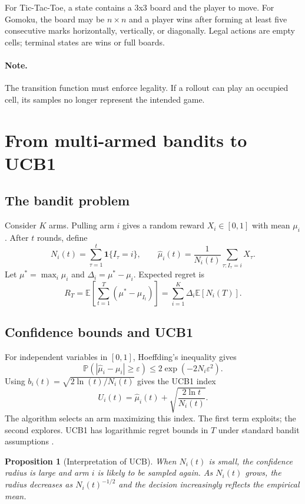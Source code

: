 \documentclass[conference]{IEEEtran}
\newtheorem{proposition}[definition]{Proposition}
\newcommand{\E}{\mathbb{E}}
\newcommand{\Prob}{\mathbb{P}}
\begin{document}
For Tic-Tac-Toe, a state contains a 3x3 board and the player to move. For Gomoku,
the board may be $n\times n$ and a player wins after forming at least five
consecutive marks horizontally, vertically, or diagonally. Legal actions are empty
cells; terminal states are wins or full boards.

\paragraph{Note.} The transition function must enforce legality. If a rollout can
play an occupied cell, its samples no longer represent the intended game.

\section{From multi-armed bandits to UCB1}
\subsection{The bandit problem}
Consider $K$ arms. Pulling arm $i$ gives a random reward $X_i\in[0,1]$ with mean
$\mu_i$. After $t$ rounds, define
\[
N_i(t)=\sum_{\tau=1}^{t}\mathbf 1\{I_\tau=i\},\qquad
\widehat\mu_i(t)=\frac{1}{N_i(t)}\sum_{\tau:I_\tau=i}X_\tau.
\]
Let $\mu^*=\max_i\mu_i$ and $\Delta_i=\mu^*-\mu_i$. Expected regret is
\[
R_T=\E\!\left[\sum_{t=1}^{T}(\mu^*-\mu_{I_t})\right]
=\sum_{i=1}^{K}\Delta_i\E[N_i(T)].
\]

\subsection{Confidence bounds and UCB1}
For independent variables in $[0,1]$, Hoeffding's inequality gives
\[
\Prob(|\widehat\mu_i-\mu_i|\geq\varepsilon)
\leq 2\exp(-2N_i\varepsilon^2).
\]
Using $b_i(t)=\sqrt{2\ln(t)/N_i(t)}$ gives the UCB1 index
\[
U_i(t)=\widehat\mu_i(t)+\sqrt{\frac{2\ln t}{N_i(t)}}.
\]
The algorithm selects an arm maximizing this index. The first term exploits; the
second explores. UCB1 has logarithmic regret bounds in $T$ under standard bandit
assumptions \cite{auer2002}.

\begin{proposition}[Interpretation of UCB]
When $N_i(t)$ is small, the confidence radius is large and arm $i$ is likely to be
sampled again. As $N_i(t)$ grows, the radius decreases as $N_i(t)^{-1/2}$ and
the decision increasingly reflects the empirical mean.
\end{proposition}
\end{document}
